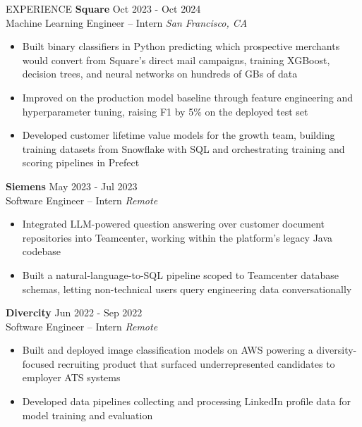 \documentclass{resume} %
\begin{document}
\begin{rSection}{EXPERIENCE}
    \textbf{Square} \hfill Oct 2023 - Oct 2024\\
    Machine Learning Engineer -- Intern \hfill \textit{San Francisco, CA}
     \begin{itemize}
        \item Built binary classifiers in Python predicting which prospective merchants would convert from Square's direct mail campaigns, training XGBoost, decision trees, and neural networks on hundreds of GBs of data
        \item Improved on the production model baseline through feature engineering and hyperparameter tuning, raising F1 by 5\% on the deployed test set
        \item Developed customer lifetime value models for the growth team, building training datasets from Snowflake with SQL and orchestrating training and scoring pipelines in Prefect
     \end{itemize}
     
    \textbf{Siemens} \hfill May 2023 - Jul 2023\\
    Software Engineer -- Intern \hfill \textit{Remote}
     \begin{itemize}
        \item Integrated LLM-powered question answering over customer document repositories into Teamcenter, working within the platform's legacy Java codebase
        \item Built a natural-language-to-SQL pipeline scoped to Teamcenter database schemas, letting non-technical users query engineering data conversationally
     \end{itemize}
    
    \textbf{Divercity} \hfill Jun 2022 - Sep 2022\\
    Software Engineer -- Intern \hfill \textit{Remote}
     \begin{itemize}
        \item Built and deployed image classification models on AWS powering a diversity-focused recruiting product that surfaced underrepresented candidates to employer ATS systems
        \item Developed data pipelines collecting and processing LinkedIn profile data for model training and evaluation
     \end{itemize}
    
    \end{rSection}
    

\end{document}
